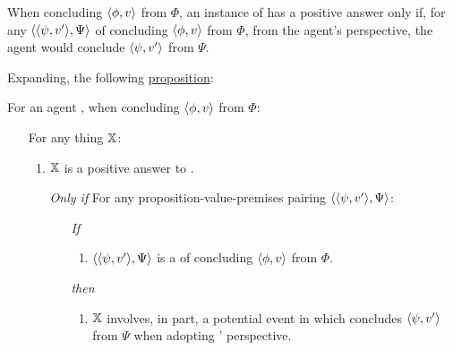 \begin{note}

  When concluding \(\pv{\phi}{v}\) from \(\Phi\), an instance of \qzS{} has a positive answer only if, for any \requ{} \(\pvp{\psi}{v'}{\Psi}\) of concluding \(\pv{\phi}{v}\) from \(\Phi\), from the agent's perspective, the agent would conclude \(\pv{\psi}{v'}\) from \(\Psi\).

  Expanding, the following \hyperref[prop:PWEs]{proposition}:

  \begin{proposition}
    \label{prop:PWEs}
    For an agent \vAgent{}, when concluding \(\pv{\phi}{v}\) from \(\Phi\):

    \begin{itemize}
    \item[]
      For any thing \(\qzSaV{}\):
      \begin{enumerate}[label=\alph*., ref=(\alph*)]
      \item
        \label{prop:PWEs:a}
        \(\qzSaV{}\) is a positive answer to \qzS{}.
      \end{enumerate}
      \begin{itemize}
      \item[\emph{Only if}]
        For any proposition-value-premises pairing \(\pvp{\psi}{v'}{\Psi}\):
        \begin{itemize}
        \item[\emph{If}]
          \begin{enumerate}[label=\alph*., ref=(\alph*), resume]
          \item
            \label{prop:PWEs:b}
            \(\pvp{\psi}{v'}{\Psi}\) is a \requ{} of \vAgent{} concluding \(\pv{\phi}{v}\) from \(\Phi\).
          \end{enumerate}
        \item[\emph{then}]
          \begin{enumerate}[label=\alph*., ref=(\alph*), resume]
          \item
            \label{prop:PWEs:c}
            \(\qzSaV{}\) involves, in part, a potential event in which \vAgent{} concludes \(\pv{\psi}{v'}\) from \(\Psi\) when adopting \vAgent{}' perspective.
          \end{enumerate}
        \end{itemize}
      \end{itemize}
    \end{itemize}
  \end{proposition}


\end{note}
